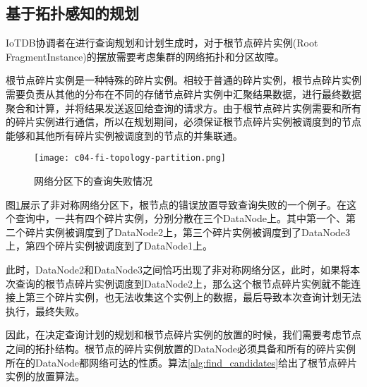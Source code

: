 \subsection{基于拓扑感知的规划}

IoTDB协调者在进行查询规划和计划生成时，对于根节点碎片实例(Root FragmentInstance)的摆放需要考虑集群的网络拓扑和分区故障。

根节点碎片实例是一种特殊的碎片实例。相较于普通的碎片实例，根节点碎片实例需要负责从其他的分布在不同的存储节点碎片实例中汇聚结果数据，进行最终数据聚合和计算，并将结果发送返回给查询的请求方。由于根节点碎片实例需要和所有的碎片实例进行通信，所以在规划期间，必须保证根节点碎片实例被调度到的节点能够和其他所有碎片实例被调度到的节点的并集联通。


\begin{figure}
  \centering
  \texttt{[image: c04-fi-topology-partition.png]}
  \caption{网络分区下的查询失败情况}
  \label{fig:fi-topology-partition}
\end{figure}

图\ref{fig:fi-topology-partition}展示了非对称网络分区下，根节点的错误放置导致查询失败的一个例子。在这个查询中，一共有四个碎片实例，分别分散在三个DataNode上。其中第一个、第二个碎片实例被调度到了DataNode2上，第三个碎片实例被调度到了DataNode3上，第四个碎片实例被调度到了DataNode1上。

此时，DataNode2和DataNode3之间恰巧出现了非对称网络分区，此时，如果将本次查询的根节点碎片实例调度到DataNode2上，那么这个根节点碎片实例就不能连接上第三个碎片实例，也无法收集这个实例上的数据，最后导致本次查询计划无法执行，最终失败。

因此，在决定查询计划的规划和根节点碎片实例的放置的时候，我们需要考虑节点之间的拓扑结构。根节点的碎片实例放置的DataNode必须具备和所有的碎片实例所在的DataNode都网络可达的性质。算法\ref{alg:find_candidates}给出了根节点碎片实例的放置算法。



